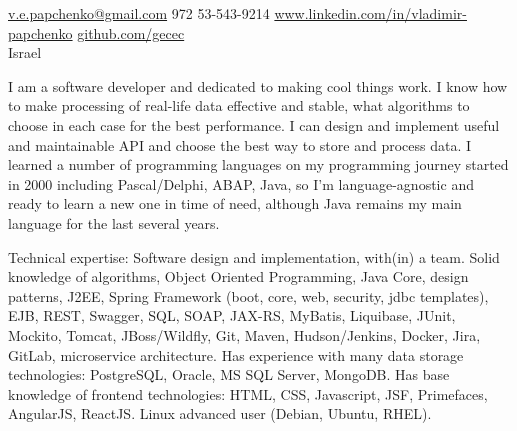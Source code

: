 \documentclass[10pt,a4paper]{article}
\begin{document}
\sloppy  %



\nobreakvspace{0.3em}  %

\noindent\href{mailto:v.e.papchenko.at.gmail.dot.com}{v.e.papchenko\mbox{}@\mbox{}gmail.com}\sbull
\textsmaller{+}972 53-543-9214\sbull
\href{https://www.linkedin.com/in/vladimir-papchenko}{www.linkedin.com/in/vladimir-papchenko}\sbull
\href{https://github.com/gecec}{github.com/gecec}
\\
Israel

\spacedhrule{0.9em}{-0.4em}  %


\vspace{-1.3em}  %
\begin{multicols}{2}  %
\noindent
I am a software developer and dedicated to making cool things work. I know how to make processing of real-life data effective and stable, what algorithms to choose in each case for the best performance. I can design and implement useful and maintainable API and choose the best way to store and process data. I learned a number of programming languages on my programming journey started in 2000 including Pascal/Delphi, ABAP, Java, so I'm  language-agnostic and ready to learn a new one in time of need, although Java remains my main language for the last several years.
\end{multicols}

\spacedhrule{0.2em}{-0.3em}

\inlineheadsection  %
  {Technical expertise:}
  {Software design and implementation, with(in) a team. Solid knowledge of algorithms, Object Oriented Programming, Java Core, design patterns, J2EE, Spring Framework (boot, core, web, security, jdbc templates), EJB, REST, Swagger, SQL, SOAP, JAX-RS, MyBatis, Liquibase, JUnit, Mockito, Tomcat, JBoss/Wildfly, Git, Maven, Hudson/Jenkins, Docker, Jira, GitLab, microservice architecture. Has experience with many data storage technologies: PostgreSQL, Oracle, MS SQL Server, MongoDB. Has base knowledge of frontend technologies: HTML, CSS, Javascript, JSF, Primefaces, AngularJS, ReactJS. Linux advanced user (Debian, Ubuntu, RHEL).}
\end{document}
